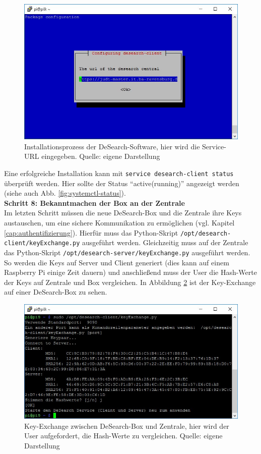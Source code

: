 \begin{figure}
	\centering
	\includegraphics[width=\textwidth]{images/installation2}
	\caption[Eingabe der Service-URL bei Installation der DeSearch-Software]{Installationsprozess der DeSearch-Software, hier wird die Service-URL eingegeben. Quelle: eigene Darstellung}
	\label{fig:installation2}
\end{figure}  
Eine erfolgreiche Installation kann mit \texttt{service desearch-client status} überprüft werden. Hier sollte der Status \enquote{active(running)} angezeigt werden (siehe auch Abb. \ref{fig:systemctl-status}).\\
\textbf{Schritt 8: Bekanntmachen der Box an der Zentrale}\\
Im letzten Schritt müssen die neue DeSearch-Box und die Zentrale ihre Keys austauschen, um eine sichere Kommunikation zu ermöglichen (vgl. Kapitel \ref{cap:authentifizierung}). Hierfür muss das Python-Skript \texttt{/opt/desearch-client/keyExchange.py} ausgeführt werden. Gleichzeitig muss auf der Zentrale das Python-Skript \texttt{/opt/desearch-server/keyExchange.py} ausgeführt werden. So werden die Keys auf Server und Client generiert (dies kann auf einem Raspberry Pi einige Zeit dauern) und anschließend muss der User die Hash-Werte der Keys auf Zentrale und Box vergleichen. In Abbildung \ref{fig:keyEx} ist der Key-Exchange auf einer DeSearch-Box zu sehen. 
\begin{figure}
	\centering
	\includegraphics[width=\textwidth]{images/keyExchange}
	\caption[Key-Exchange zwischen DeSearch-Box und Zentrale]{Key-Exchange zwischen DeSearch-Box und Zentrale, hier wird der User aufgefordert, die Hash-Werte zu vergleichen. Quelle: eigene Darstellung}
	\label{fig:keyEx}
\end{figure}
